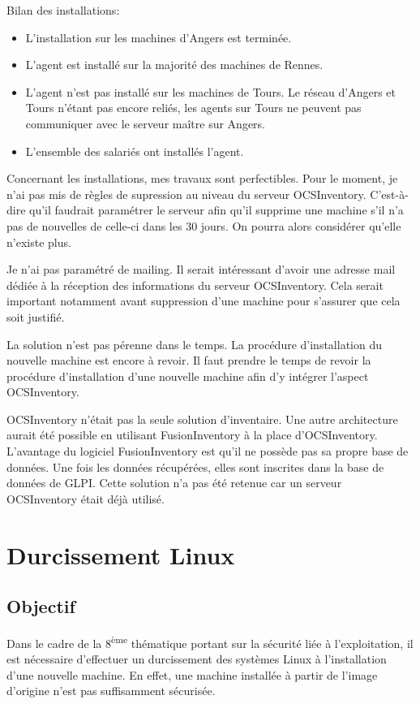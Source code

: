 \documentclass[12pt, a4paper, twoside]{article}
\begin{document}
Bilan des installations: 
\begin{itemize}
    \item L'installation sur les machines d'Angers est terminée.
    \item L'agent est installé sur la majorité des machines de Rennes.
    \item L'agent n'est pas installé sur les machines de Tours. 
    Le réseau d'Angers et Tours n'étant pas encore reliés, les agents sur Tours ne peuvent pas communiquer avec le serveur maître sur Angers.
    \item L'ensemble des salariés ont installés l'agent.
\end{itemize}

Concernant les installations, mes travaux sont perfectibles.
Pour le moment, je n'ai pas mis de règles de supression au niveau du serveur \gls{OCSInventory}.
C'est-à-dire qu'il faudrait paramétrer le serveur afin qu'il supprime une machine s'il n'a pas de nouvelles de celle-ci dans les 30 jours.
On pourra alors considérer qu'elle n'existe plus.

Je n'ai pas paramétré de mailing.
Il serait intéressant d'avoir une adresse mail dédiée à la réception des informations du serveur \gls{OCSInventory}.
Cela serait important notamment avant suppression d'une machine pour s'assurer que cela soit justifié.

La solution n'est pas pérenne dans le temps.
La procédure d'installation du nouvelle machine est encore à revoir.
Il faut prendre le temps de revoir la procédure d'installation d'une nouvelle machine afin d'y intégrer l'aspect \gls{OCSInventory}.

\gls{OCSInventory} n'était pas la seule solution d'inventaire.
Une autre architecture aurait été possible en utilisant FusionInventory à la place d'\gls{OCSInventory}. 
L'avantage du logiciel FusionInventory est qu'il ne possède pas sa propre base de données. 
Une fois les données récupérées, elles sont inscrites dans la base de données de \gls{GLPI}. 
Cette solution n'a pas été retenue car un serveur \gls{OCSInventory} était déjà utilisé.

\newpage
\section{Durcissement Linux}
\subsection{Objectif}
Dans le cadre de la 8\textsuperscript{ème} thématique portant sur la sécurité liée à l'exploitation, il est nécessaire d'effectuer un durcissement des systèmes \gls{Linux} à l'installation d'une nouvelle machine. 
En effet, une machine installée à partir de l'image d'origine n'est pas suffisamment sécurisée.
\end{document}
